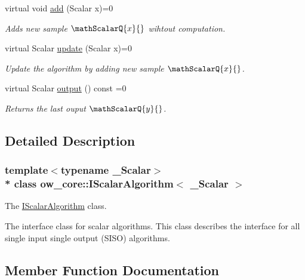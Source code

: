 \begin{DoxyCompactItemize}
virtual void \hyperlink{classow__core_1_1IScalarAlgorithm_a85de69b86d5a9a6f407ed959d0edc005}{add} (Scalar x)=0
\begin{DoxyCompactList}\small\item\em Adds new sample $\mathScalarQ{x}{}$ wihtout computation. \end{DoxyCompactList}\item 
virtual Scalar \hyperlink{classow__core_1_1IScalarAlgorithm_ae65a6ba8b9023700dffb504fdc265cd3}{update} (Scalar x)=0
\begin{DoxyCompactList}\small\item\em Update the algorithm by adding new sample $\mathScalarQ{x}{}$. \end{DoxyCompactList}\item 
virtual Scalar \hyperlink{classow__core_1_1IScalarAlgorithm_a068ef4f4567d9530b4014dbc203b0867}{output} () const =0\hypertarget{classow__core_1_1IScalarAlgorithm_a068ef4f4567d9530b4014dbc203b0867}{}\label{classow__core_1_1IScalarAlgorithm_a068ef4f4567d9530b4014dbc203b0867}

\begin{DoxyCompactList}\small\item\em Returns the last ouput $\mathScalarQ{y}{}$. \end{DoxyCompactList}\end{DoxyCompactItemize}


\subsection{Detailed Description}
\subsubsection*{template$<$typename \+\_\+\+Scalar$>$\\*
class ow\+\_\+core\+::\+I\+Scalar\+Algorithm$<$ \+\_\+\+Scalar $>$}

The \hyperlink{classow__core_1_1IScalarAlgorithm}{I\+Scalar\+Algorithm} class. 

The interface class for scalar algorithms. This class describes the interface for all single input single output (S\+I\+SO) algorithms. 

\subsection{Member Function Documentation}
